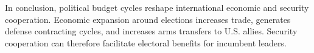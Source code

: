\documentclass[12pt]{article}
\begin{document}
In conclusion, political budget cycles reshape international economic and security cooperation.
Economic expansion around elections increases trade, generates defense contracting cycles, and increases arms transfers to U.S. allies.
Security cooperation can therefore facilitate electoral benefits for incumbent leaders. 


\newpage
\singlespace
 
 
\end{document}
